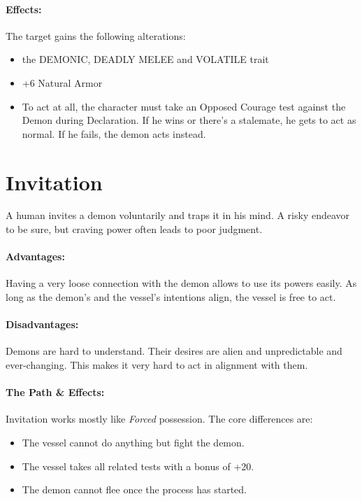 \paragraph{Effects:}
The target gains the following alterations:
\begin{itemize}
	\vspace{-10mm}
	\setlength\itemsep{-10mm}
	\item the DEMONIC, DEADLY MELEE and VOLATILE trait
	\item +6 Natural Armor
	\item To act at all, the character must take an Opposed Courage test against the Demon during Declaration.
	If he wins or there's a stalemate, he gets to act as normal.
	If he fails, the demon acts instead.
\end{itemize}

\section{Invitation}
A human invites a demon voluntarily and traps it in his mind.
A risky endeavor to be sure,
but craving power often leads to poor judgment.
\paragraph{Advantages:}
Having a very loose connection with the demon allows to use its powers easily.
As long as the demon's and the vessel's intentions align,
the vessel is free to act.
\paragraph{Disadvantages:}
Demons are hard to understand.
Their desires are alien and unpredictable and ever-changing.
This makes it very hard to act in alignment with them.
\paragraph{The Path \& Effects:}
Invitation works mostly like \emph{Forced} possession.
The core differences are:
\begin{itemize}
	\setlength\itemsep{-8mm} \vspace{-8mm}
	\item The vessel cannot do anything but fight the demon.
	\item The vessel takes all related tests with a bonus of +20.
	\item The demon cannot flee once the process has started.
\end{itemize}

